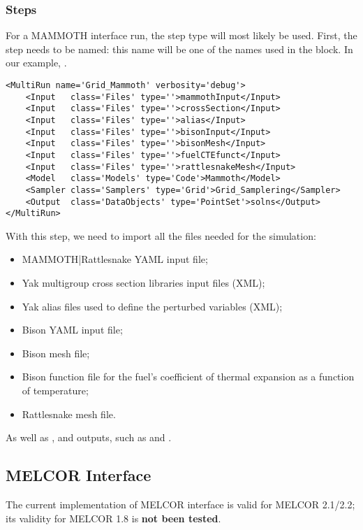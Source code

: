 \subsubsection{Steps}
For a MAMMOTH interface run, the  step type will most likely be used. First, the step needs
to be named: this name will be one of the names used in the  block. In our example, .
%
\begin{lstlisting}[style=XML]
<MultiRun name='Grid_Mammoth' verbosity='debug'>
    <Input   class='Files' type=''>mammothInput</Input>
    <Input   class='Files' type=''>crossSection</Input>
    <Input   class='Files' type=''>alias</Input>
    <Input   class='Files' type=''>bisonInput</Input>
    <Input   class='Files' type=''>bisonMesh</Input>
    <Input   class='Files' type=''>fuelCTEfunct</Input>
    <Input   class='Files' type=''>rattlesnakeMesh</Input>
    <Model   class='Models' type='Code'>Mammoth</Model>
    <Sampler class='Samplers' type='Grid'>Grid_Samplering</Sampler>
    <Output  class='DataObjects' type='PointSet'>solns</Output>
</MultiRun>
\end{lstlisting}
%
With this step, we need to import all the files needed for the simulation:
%
\begin{itemize}
  \item MAMMOTH|Rattlesnake YAML input file;
  \item Yak multigroup cross section libraries input files (XML);
  \item Yak alias files used to define the perturbed variables (XML);
  \item Bison YAML input file;
  \item Bison mesh file;
  \item Bison function file for the fuel's coefficient of thermal expansion as a function of temperature;
  \item Rattlesnake mesh file.
\end{itemize}
As well as ,  and outputs, such as  and .

\subsection{MELCOR Interface}
\label{subsec:MELCORInterface}

The current implementation of MELCOR interface is valid for MELCOR 2.1/2.2; its validity for MELCOR
1.8 is \textbf{not been tested}.

